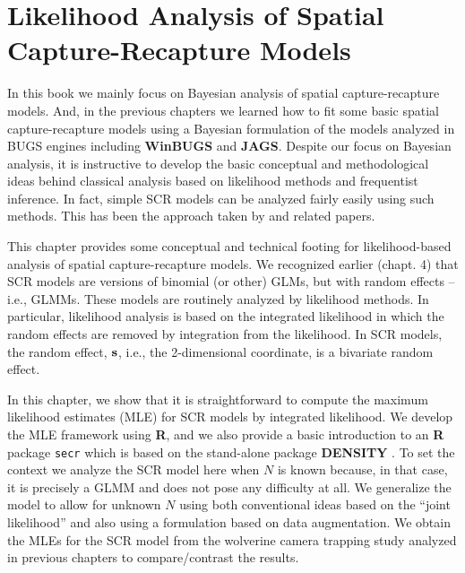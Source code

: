 \chapter{
Likelihood Analysis of Spatial Capture-Recapture Models
}
\label{chapt.mle}


\vspace{.3in}



In this book we mainly focus on Bayesian analysis of spatial
capture-recapture models. And, in the previous chapters we learned how
to fit some basic spatial capture-recapture models using a Bayesian
formulation of the models analyzed in BUGS engines including {\bf
  WinBUGS} and {\bf JAGS}.  Despite our focus on Bayesian analysis, it
is instructive to develop the basic conceptual and methodological
ideas behind classical analysis based on likelihood methods and
frequentist inference.  In fact, simple SCR models can be analyzed
fairly easily using such methods. This has been the approach taken by
\citet{borchers_efford:2008, dawson_efford:2009} and related papers.

This chapter provides some conceptual and technical footing for
likelihood-based analysis of spatial capture-recapture models. We
recognized earlier (chapt. 4) that SCR models are versions of
binomial (or other) GLMs, but with random effects – i.e., GLMMs. These
models are 
routinely analyzed by likelihood methods. In particular, likelihood
analysis is based on the integrated likelihood in which the random
effects are removed by integration from the likelihood. In SCR models,
the random effect, ${\bf s}$, i.e., the 2-dimensional coordinate, is a
bivariate random effect. 

In this chapter, we show that it is
straightforward to compute the maximum likelihood estimates (MLE) for
SCR models by integrated likelihood. We develop the MLE framework
using {\bf R}, and we also provide a basic introduction to an {\bf R} package
\mbox{\tt secr} \citep{efford:2011} which is based on the stand-alone
package 
{\bf DENSITY} \citep{efford_etal:2004}.
 To set the context we analyze the SCR model
here when $N$ is known because, in that case, it is precisely a GLMM and
does not pose any difficulty at all. We generalize the model to allow
for unknown $N$ using both conventional ideas based on the ``joint
likelihood'' \citep[e.g.,][]{borchers_etal:2002}
and also using a formulation
based on data augmentation.  We obtain the MLEs for 
the SCR model from the wolverine camera trapping study \citep{magoun_etal:2011}
 analyzed in previous chapters to compare/contrast the
results.

